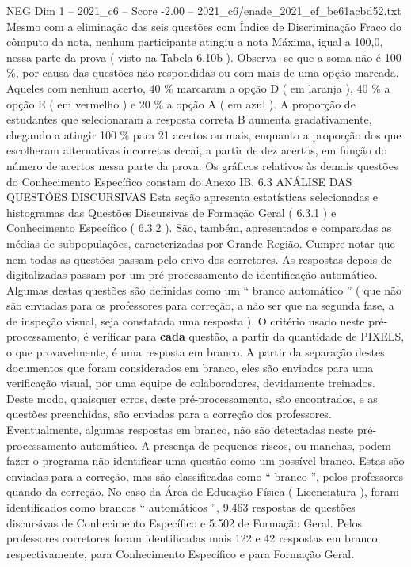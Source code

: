 \begin{textsample}{NEG Dim 1 – 2021\_c6 – Score -2.00 – 2021\_c6/enade\_2021\_ef\_be61acbd52.txt}
Mesmo com a eliminação das seis questões com Índice de Discriminação Fraco do cômputo da nota, nenhum participante atingiu a nota Máxima, igual a 100,0, nessa parte da prova ( visto na Tabela 6.10b ).
Observa -se que a soma não é 100 \%, por causa das questões não respondidas ou com mais de uma opção marcada.
Aqueles com nenhum acerto, 40 \% marcaram a opção D ( em laranja ), 40 \% a opção E ( em vermelho ) e 20 \% a opção A ( em azul ).
A proporção de estudantes que selecionaram a resposta correta B aumenta gradativamente, chegando a atingir 100 \% para 21 acertos ou mais, enquanto a proporção dos que escolheram alternativas incorretas decai, a partir de dez acertos, em função do número de acertos nessa parte da prova.
Os gráficos relativos às demais questões do Conhecimento Específico constam do Anexo IB. 6.3 ANÁLISE DAS QUESTÕES DISCURSIVAS Esta seção apresenta estatísticas selecionadas e histogramas das Questões Discursivas de Formação Geral ( 6.3.1 ) e Conhecimento Específico ( 6.3.2 ).
São, também, apresentadas e comparadas as médias de subpopulações, caracterizadas por Grande Região.
Cumpre notar que nem todas as questões passam pelo crivo dos corretores.
As respostas depois de digitalizadas passam por um pré-processamento de identificação automático.
Algumas destas questões são definidas como um “ branco automático ” ( que não são enviadas para os professores para correção, a não ser que na segunda fase, a de inspeção visual, seja constatada uma resposta ).
O critério usado neste pré-processamento, é verificar para \textbf{cada} questão, a partir da quantidade de PIXELS, o que provavelmente, é uma resposta em branco.
A partir da separação destes documentos que foram considerados em branco, eles são enviados para uma verificação visual, por uma equipe de colaboradores, devidamente treinados.
Deste modo, quaisquer erros, deste pré-processamento, são encontrados, e as questões preenchidas, são enviadas para a correção dos professores.
Eventualmente, algumas respostas em branco, não são detectadas neste pré-processamento automático.
A presença de pequenos riscos, ou manchas, podem fazer o programa não identificar uma questão como um possível branco.
Estas são enviadas para a correção, mas são classificadas como “ branco ”, pelos professores quando da correção.
No caso da Área de Educação Física ( Licenciatura ), foram identificados como brancos “ automáticos ”, 9.463 respostas de questões discursivas de Conhecimento Específico e 5.502 de Formação Geral.
Pelos professores corretores foram identificadas mais 122 e 42 respostas em branco, respectivamente, para Conhecimento Específico e para Formação Geral.

\end{textsample}
